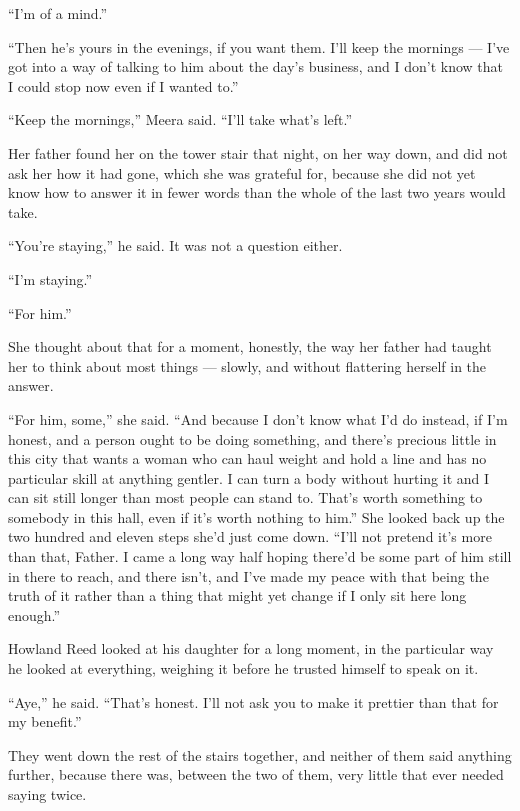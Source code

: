 “I’m of a mind.”

“Then he’s yours in the evenings, if you want them. I’ll keep the mornings — I’ve got into a way of talking to him about the day’s business, and I don’t know that I could stop now even if I wanted to.”

“Keep the mornings,” Meera said. “I’ll take what’s left.”

\sceneBreak

Her father found her on the tower stair that night, on her way down, and did not ask her how it had gone, which she was grateful for, because she did not yet know how to answer it in fewer words than the whole of the last two years would take.

“You’re staying,” he said. It was not a question either.

“I’m staying.”

“For him.”

She thought about that for a moment, honestly, the way her father had taught her to think about most things — slowly, and without flattering herself in the answer.

“For him, some,” she said. “And because I don’t know what I’d do instead, if I’m honest, and a person ought to be doing something, and there’s precious little in this city that wants a woman who can haul weight and hold a line and has no particular skill at anything gentler. I can turn a body without hurting it and I can sit still longer than most people can stand to. That’s worth something to somebody in this hall, even if it’s worth nothing to him.” She looked back up the two hundred and eleven steps she’d just come down. “I’ll not pretend it’s more than that, Father. I came a long way half hoping there’d be some part of him still in there to reach, and there isn’t, and I’ve made my peace with that being the truth of it rather than a thing that might yet change if I only sit here long enough.”

Howland Reed looked at his daughter for a long moment, in the particular way he looked at everything, weighing it before he trusted himself to speak on it.

“Aye,” he said. “That’s honest. I’ll not ask you to make it prettier than that for my benefit.”

They went down the rest of the stairs together, and neither of them said anything further, because there was, between the two of them, very little that ever needed saying twice.